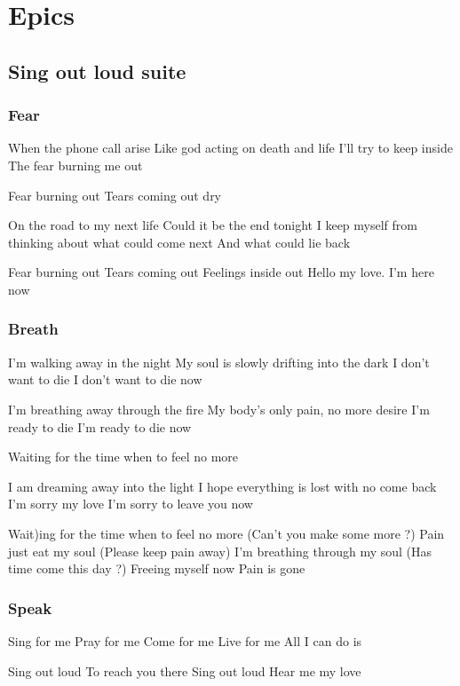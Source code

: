 \documentclass{article}
\newenvironment{album}[1]%
{%
  \section*{#1}
}%
{%
}
\newenvironment{song}[1]%
{%
  \subsection*{\textbf{#1}}
  \begin{multicols*}{2}
}%
{%
  \end{multicols*}
  \newpage
}
\newenvironment{partie}[1]%
{%
  \subsubsection{#1}
}%
{%
}
\newenvironment{couplet} %
{%
  \verbatim
}%
{% end code
  \endverbatim
}
\newenvironment{refrain} %
{%
  \verbatim
}%
{% end code
  \endverbatim
}
\begin{document}
\begin{album}{Epics}
\begin{song}{Sing out loud suite}
\begin{partie}{Fear}
\begin{couplet}
When the phone call arise
Like god acting on death and life
I'll try to keep inside
The fear burning me out 
\end{couplet}
\begin{refrain}
Fear burning out
Tears coming out dry   
\end{refrain}    
\begin{couplet}
On the road to my next life
Could it be the end tonight
I keep myself from thinking about what could come next
And what could lie back
\end{couplet}
\begin{refrain}
Fear burning out
Tears coming out
Feelings inside out
Hello my love. I'm here now  
\end{refrain}
\end{partie}
\begin{partie}{Breath}
\begin{couplet}
I'm walking away in the night
My soul is slowly drifting into the dark
I don't want to die
I don't want to die now  
\end{couplet}
\begin{couplet}
I'm breathing away through the fire
My body's only pain, no more desire
I'm ready to die
I'm ready to die now 
\end{couplet}
\begin{refrain}
Waiting for the time when to feel no more
\end{refrain}
\begin{couplet}
I am dreaming away into the light
I hope everything is lost with no come back
I'm sorry my love
I'm sorry to leave you now 
\end{couplet}  
\begin{refrain}
Wait)ing for the time when to feel no more
(Can't you make some more ?)
Pain just eat my soul
(Please keep pain away)
I'm breathing through my soul
(Has time come this day ?)
Freeing myself now
Pain is gone
\end{refrain}
\end{partie}  
\begin{partie}{Speak}
\begin{couplet}
Sing for me
Pray for me
Come for me
Live for me
All I can do is
\end{couplet}
\begin{refrain}
Sing out loud
To reach you there
Sing out loud
Hear me my love
\end{refrain}

\end{partie}
\end{song}
\end{album}
\end{document}
